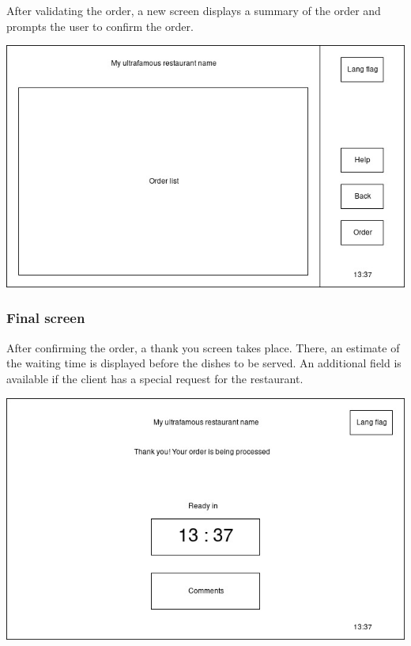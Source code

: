 \documentclass[a4paper,12pt]{article}
\begin{document}
After validating the order, a new screen displays a summary of the order and prompts the user to confirm the order.

\begin{center}
	\includegraphics[width=\textwidth]{confirmation_screen.jpg}
\end{center}

\subsubsection{Final screen}

After confirming the order, a thank you screen takes place. There, an estimate of the waiting time is displayed
before the dishes to be served. An additional field is available if the client has a special request for the
restaurant.

\begin{center}
	\includegraphics[width=\textwidth]{final_screen.jpg}
\end{center}
\end{document}
